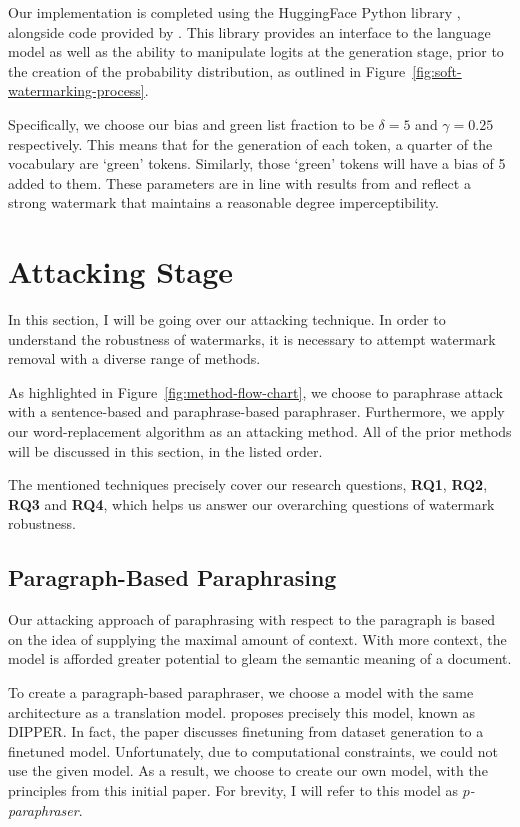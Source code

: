 \documentclass{l4proj}
\theoremstyle{definition}
\begin{document}
        Our implementation is completed using the HuggingFace Python library \citep{wolf-etal-2020-transformers}, alongside code provided by \citet{kirchenbauer2023watermark}. This library provides an interface to the language model as well as the ability to manipulate logits at the generation stage, prior to the creation of the probability distribution, as outlined in Figure~\ref{fig:soft-watermarking-process}. 

        Specifically, we choose our bias and green list fraction to be $\delta = 5$ and $\gamma = 0.25$ respectively. This means that for the generation of each token, a quarter of the vocabulary are `green' tokens. Similarly, those `green' tokens will have a bias of 5 added to them. These parameters are in line with results from \citet{kirchenbauer2023watermark} and reflect a strong watermark that maintains a reasonable degree imperceptibility.

\section{Attacking Stage}
    In this section, I will be going over our attacking technique. In order to understand the robustness of watermarks, it is necessary to attempt watermark removal with a diverse range of methods. 

    As highlighted in Figure~\ref{fig:method-flow-chart}, we choose to paraphrase attack with a sentence-based and paraphrase-based paraphraser. Furthermore, we apply our word-replacement algorithm as an attacking method. All of the prior methods will be discussed in this section, in the listed order.

    The mentioned techniques precisely cover our research questions, \textbf{RQ1}, \textbf{RQ2}, \textbf{RQ3} and \textbf{RQ4}, which helps us answer our overarching questions of watermark robustness.

    \subsection{Paragraph-Based Paraphrasing}
        \label{sec:paragraph-paraphraser}
        Our attacking approach of paraphrasing with respect to the paragraph is based on the idea of supplying the maximal amount of context. With more context, the model is afforded greater potential to gleam the semantic meaning of a document. 
    
        To create a paragraph-based paraphraser, we choose a model with the same architecture as a translation model. \citet{krishna2023paraphrasing} proposes precisely this model, known as DIPPER. In fact, the paper discusses finetuning from dataset generation to a finetuned model. Unfortunately, due to computational constraints, we could not use the given model. As a result, we choose to create our own model, with the principles from this initial paper. For brevity, I will refer to this model as \emph{$p$-paraphraser}.
        
\end{document}
